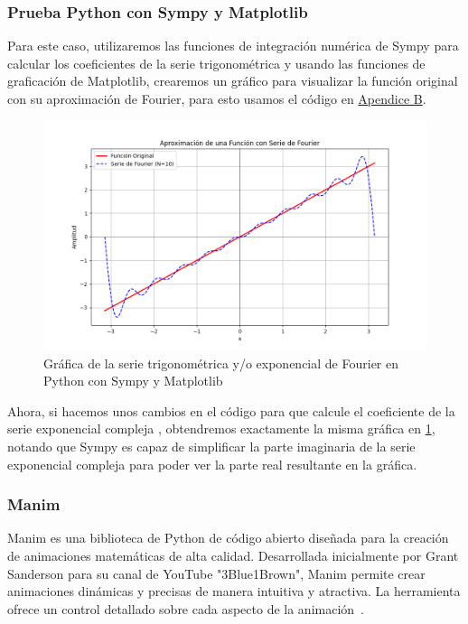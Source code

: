 \subsubsection{Prueba Python con Sympy y Matplotlib}
Para este caso, utilizaremos las funciones de integración numérica de Sympy para calcular los coeficientes de la serie trigonométrica y usando las funciones de graficación de Matplotlib, crearemos un gráfico para visualizar la función original con su aproximación de Fourier, para esto usamos el código en \hyperref[app2:complex-code-python-matplotlib-sympy]{Apendice B}. 
\begin{figure}[H]
	\centering
	\includegraphics[width=1\textwidth]{img/chapter02/python-sympy-matplotlib.png}
	\caption{Gráfica de la serie trigonométrica y/o exponencial de Fourier en Python con Sympy y Matplotlib}
	\label{fig:python-matplotlib-sympy-trig-series}  %
\end{figure}
Ahora, si hacemos unos cambios en el código para que calcule el coeficiente de la serie exponencial compleja \hyperref[app2:complex-code-python-matplotlib-sympy], obtendremos exactamente la misma gráfica en \ref{fig:python-matplotlib-sympy-trig-series}, notando que Sympy es capaz de simplificar la parte imaginaria de la serie exponencial compleja para poder ver la parte real resultante en la gráfica.

\subsubsection{Manim}
Manim es una biblioteca de Python de código abierto diseñada para la creación de animaciones matemáticas de alta calidad. Desarrollada inicialmente por Grant Sanderson para su canal de YouTube "3Blue1Brown", Manim permite crear animaciones dinámicas y precisas de manera intuitiva y atractiva. La herramienta ofrece un control detallado sobre cada aspecto de la animación~\cite{Manim2024}.
